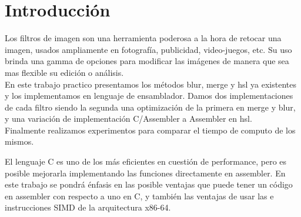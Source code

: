 \documentclass[a4paper]{article}
\begin{document}
\thispagestyle{empty}

\maketitle
\newpage


\vspace{3cm}
\tableofcontents
\thispagestyle{empty}

\newpage

\setcounter{page}{1}

\section{Introducción}

Los filtros de imagen son una herramienta poderosa a la hora de retocar una imagen, usados ampliamente en fotografía, publicidad, video-juegos, etc.
Su uso brinda una gamma de opciones para modificar las imágenes de manera que sea mas flexible su edición o análisis.\\
En este trabajo practico presentamos los métodos blur, merge y hsl ya existentes y los implementamos en lenguaje de ensamblador.
Damos dos implementaciones de cada filtro siendo la segunda una optimización de la primera en merge y blur, y una variación de implementación C/Assembler a Assembler en hsl.\\
Finalmente realizamos experimentos para comparar el tiempo de computo de los mismos.
 
El lenguaje C es uno de los más eficientes en cuestión de performance, pero es posible mejorarla implementando las funciones directamente en assembler. En este trabajo se pondrá énfasis en las posible ventajas que puede tener un código en assembler con respecto a uno en C, y también las ventajas de usar las e instrucciones SIMD de la arquitectura x86-64.
\end{document}
